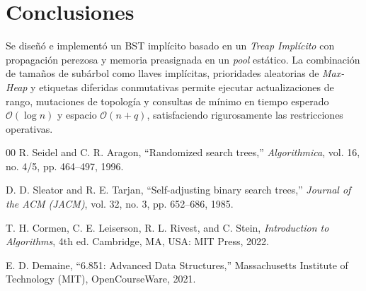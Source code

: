 \documentclass[journal,10pt,a4paper]{IEEEtran}
\begin{document}
\section{Conclusiones}

Se diseñó e implementó un BST implícito basado en un \textit{Treap Implícito} con propagación perezosa y memoria preasignada en un \textit{pool} estático. La combinación de tamaños de subárbol como llaves implícitas, prioridades aleatorias de \textit{Max-Heap} y etiquetas diferidas conmutativas permite ejecutar actualizaciones de rango, mutaciones de topología y consultas de mínimo en tiempo esperado $\mathcal{O}(\log n)$ y espacio $\mathcal{O}(n + q)$, satisfaciendo rigurosamente las restricciones operativas.

\begin{thebibliography}{00}
R. Seidel and C. R. Aragon, ``Randomized search trees,'' \textit{Algorithmica}, vol. 16, no. 4/5, pp. 464--497, 1996.

D. D. Sleator and R. E. Tarjan, ``Self-adjusting binary search trees,'' \textit{Journal of the ACM (JACM)}, vol. 32, no. 3, pp. 652--686, 1985.

T. H. Cormen, C. E. Leiserson, R. L. Rivest, and C. Stein, \textit{Introduction to Algorithms}, 4th ed. Cambridge, MA, USA: MIT Press, 2022.

E. D. Demaine, ``6.851: Advanced Data Structures,'' Massachusetts Institute of Technology (MIT), OpenCourseWare, 2021.
\end{thebibliography}
\end{document}
